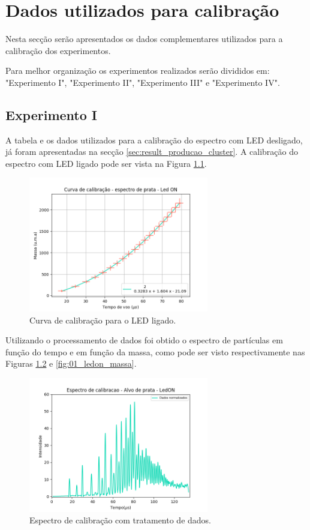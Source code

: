 \appendix
\chapter{Dados utilizados para calibração}
\label{sec:apendice}
Nesta secção serão apresentados os dados complementares utilizados para a calibração dos experimentos.

Para melhor organização os experimentos realizados serão divididos em: "Experimento I", "Experimento II", "Experimento III" e "Experimento IV".

\section{Experimento I}
A tabela e os dados utilizados para a calibração do espectro com LED desligado, já foram apresentadas na secção \ref{sec:result_producao_cluster}. A calibração do espectro com LED ligado pode ser vista na Figura \ref{fig:01_calib_ledON}.

\begin{figure}
  \centering  
  \includegraphics[width=0.7\textwidth]{exp_01/LEDON_curv+erro_calib.png}
  \caption{Curva de calibração para o LED ligado.}
  \label{fig:01_calib_ledON} 
\end{figure}

Utilizando o processamento de dados foi obtido o espectro de partículas em função do tempo e em função da massa, como pode ser visto respectivamente nas Figuras \ref{fig:01_ledon_dados_tratados} e \ref{fig:01_ledon_massa}.

\begin{figure}
  \centering  
  \includegraphics[width=0.7\textwidth]{exp_01/LedON_normalizado_mcp.png}
  \caption{Espectro de calibração com tratamento de dados.}
  \label{fig:01_ledon_dados_tratados} 
\end{figure}

